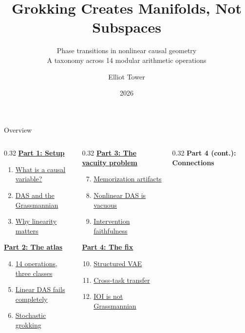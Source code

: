 \documentclass[aspectratio=169,11pt]{beamer}
\title{Grokking Creates Manifolds, Not Subspaces}
\subtitle{Phase transitions in nonlinear causal geometry\\[0.3em]{\small A taxonomy across 14 modular arithmetic operations}}
\author{Elliot Tower}
\date{2026}
\institute{}
\begin{document}
\maketitle

\begin{frame}{Overview}
\begin{columns}[T]
\begin{column}{0.32\textwidth}
\textbf{\hyperlink{part1}{Part 1: Setup}}
\begin{enumerate}
  \item \hyperlink{sec1}{What is a causal variable?}
  \item \hyperlink{sec2}{DAS and the Grassmannian}
  \item \hyperlink{sec3}{Why linearity matters}
\end{enumerate}
\vspace{0.5em}
\textbf{\hyperlink{part2}{Part 2: The atlas}}
\begin{enumerate}
  \setcounter{enumi}{3}
  \item \hyperlink{sec4}{14 operations, three classes}
  \item \hyperlink{sec5}{Linear DAS fails completely}
  \item \hyperlink{sec6}{Stochastic grokking}
\end{enumerate}
\end{column}
\begin{column}{0.32\textwidth}
\textbf{\hyperlink{part3}{Part 3: The vacuity problem}}
\begin{enumerate}
  \setcounter{enumi}{6}
  \item \hyperlink{sec7}{Memorization artifacts}
  \item \hyperlink{sec8}{Nonlinear DAS is vacuous}
  \item \hyperlink{sec9}{Intervention faithfulness}
\end{enumerate}
\vspace{0.5em}
\textbf{\hyperlink{part4}{Part 4: The fix}}
\begin{enumerate}
  \setcounter{enumi}{9}
  \item \hyperlink{sec10}{Structured VAE}
  \item \hyperlink{sec11}{Cross-task transfer}
  \item \hyperlink{sec12}{IOI is not Grassmannian}
\end{enumerate}
\end{column}
\begin{column}{0.32\textwidth}
\textbf{Part 4 (cont.): Connections}

\end{column}
\end{columns}
\end{frame}
\end{document}
